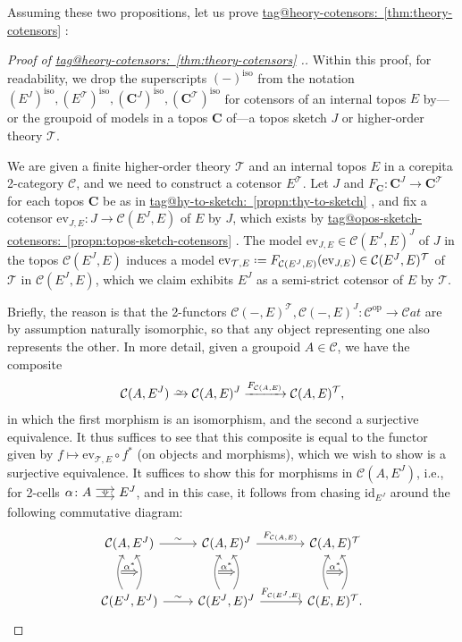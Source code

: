 \documentclass{amsart}
\makeatletter
\newcommand\bC{\mathbf{C}}
\newcommand\Cat{\mathcal{C}at}
\newcommand\cC{\mathcal{C}}
\newcommand\cT{\mathcal{T}}
\newcommand\defeq{\mathrel{\vcenter{\baselineskip0.5ex \lineskiplimit0pt \hbox{.}\hbox{.}}} =}
\newcommand\ev{\mathrm{ev}}
\newcommand\id{\mathrm{id}}
\newcommand\iso{\mathrm{iso}}
\newcommand\op{\mathrm{op}}
\newcommand\tocell{\hspace{-5pt}\begin{tikzcd}[column sep=15pt, ampersand replacement=\&]{}\ar[r, shift left=3pt, ""{name=top}]\ar[r, shift right=3pt, ""'{name=bot}, start anchor=east, end anchor=west]\&{}\ar[Rightarrow, from=top, to=bot, shorten=0.5pt]\end{tikzcd}\hspace{-5pt}}
\newcommand\toi{\xrightarrow{\raisebox{-2.5pt}[0pt][0pt]{\ensuremath{\scriptstyle{\sim}}}}}
\newcommand\tox[2][]{\xrightarrow[#1]{#2}}
\newcommand\tagword[1]{\csname tag@#1\endcsname}
\def\label@tag#1:#2\@nil{#1}
\newcommand\labeltag[1]{\label@tag#1:\@nil}
\newcommand\jref[1]{%
  \texorpdfstring%
    {\hyperref[#1]{\tagword{\labeltag{#1}}~\ref*{#1}}}%
    {\tagword{\labeltag{#1}}~\ref*{#1}}%
}
\theoremstyle{definition}
\theoremstyle{remark}
\theoremstyle{plainwithref}
\makeatother
\begin{document}
Assuming these two propositions, let us prove \jref{thm:theory-cotensors}:
\begin{proof}[Proof of \jref{thm:theory-cotensors}.] \label{proof:theory-cotensors}
  Within this proof, for readability, we drop the superscripts \( (-)^\iso \) from the notation \( (E^J)^\iso, (E^\cT)^\iso, (\bC^J)^\iso, (\bC^\cT)^\iso \) for cotensors of an internal topos \( E \) by---or the groupoid of models in a topos \( \bC \) of---a topos sketch \( J \) or higher-order theory \( \cT \).

  We are given a finite higher-order theory \( \cT \) and an internal topos \( E \) in a corepita 2-category \( \cC \), and we need to construct a cotensor \( E^{\cT} \).
  Let \( J \) and \( F_{\bC} \colon \bC^J \to \bC^{\cT} \) for each topos \( \bC \) be as in \jref{propn:thy-to-sketch}, and fix a cotensor \( \ev_{J,E} \colon J \to \cC(E^J,E) \) of \( E \) by \( J \), which exists by \jref{propn:topos-sketch-cotensors}.
  The model \( \ev_{J,E} \in \cC(E^J,E)^J \) of \( J \) in the topos \( \cC(E^J,E) \) induces a model \( \ev_{\cT,E} \defeq F_{\cC(E^J,E)}(\ev_{J,E}) \in \cC(E^J,E)^\cT \) of \( \cT \) in \( \cC(E^J,E) \), which we claim exhibits \( E^J \) as a semi-strict cotensor of \( E \) by \( \cT \).

  Briefly, the reason is that the 2-functors \( \cC(-,E)^\cT, \cC(-,E)^J \colon \cC^\op \to \Cat \) are by assumption naturally isomorphic, so that any object representing one also represents the other.
  In more detail, given a groupoid \( A \in \cC \), we have the composite
  \[
    \cC(A, E^J) \toi \cC(A, E)^J \tox{F_{\cC(A, E)}} \cC(A, E)^\cT,
  \]
  in which the first morphism is an isomorphism, and the second a surjective equivalence.
  It thus suffices to see that this composite is equal to the functor given by \( f \mapsto \ev_{\cT, E} \circ f^* \) (on objects and morphisms), which we wish to show is a surjective equivalence.
  It suffices to show this for morphisms in \( \cC(A, E^J) \), i.e., for 2-cells \( \alpha \colon A \tocell E^J \), and in this case, it follows from chasing \( \id_{E^J} \) around the following commutative diagram:
  \[
    \begin{tikzcd}[baseline=(bl.base)]
      \cC(A,E^J) \ar[r, "\sim"] & \cC(A,E)^J  \ar[r, "F_{\cC(A,E)}"] &[10pt] \cC(A,E)^\cT \\[10pt]
      \cC(E^J, E^J) \ar[r, "\sim"] \ar[u, bend left, ""' {name=f1}] \ar[u, bend right, "" {name=g1}] &
      \cC(E^J,E)^J \ar[r, "F_{\cC(E^J,E)}"] \ar[u, bend left, ""' {name=f2}] \ar[u, bend right, "" {name=g2}] &
      |[alias=bl]| \cC(E,E)^\cT \ar[u, bend left, ""' {name=f3}] \ar[u, bend right, "" {name=g3}].
      \ar[from=f1, to=g1, "\alpha^*", Rightarrow, shorten=-2pt]
      \ar[from=f2, to=g2, "\alpha^*", Rightarrow, shorten=-2pt]
      \ar[from=f3, to=g3, "\alpha^*", Rightarrow, shorten=-2pt]
    \end{tikzcd}
    \qedhere
  \]
\end{proof}
\end{document}
